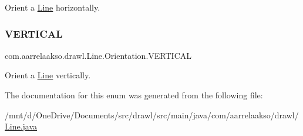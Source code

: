 Orient a \hyperlink{classcom_1_1aarrelaakso_1_1drawl_1_1_line}{Line} horizontally. \mbox{\label{enumcom_1_1aarrelaakso_1_1drawl_1_1_line_1_1_orientation_ae5abbefd554c0775da068445e8bd65ae}} 
\subsubsection{\texorpdfstring{V\+E\+R\+T\+I\+C\+AL}{VERTICAL}}
{\footnotesize\ttfamily com.\+aarrelaakso.\+drawl.\+Line.\+Orientation.\+V\+E\+R\+T\+I\+C\+AL}

Orient a \hyperlink{classcom_1_1aarrelaakso_1_1drawl_1_1_line}{Line} vertically. 

The documentation for this enum was generated from the following file\+:\begin{DoxyCompactItemize}
\item 
/mnt/d/\+One\+Drive/\+Documents/src/drawl/src/main/java/com/aarrelaakso/drawl/\hyperlink{_line_8java}{Line.\+java}\end{DoxyCompactItemize}
